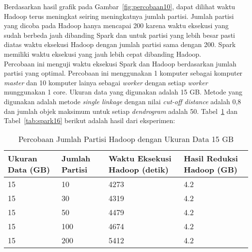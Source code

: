 Berdasarkan hasil grafik pada Gambar~\ref{fig:percobaan10}, dapat dilihat waktu Hadoop terus meningkat seiring meningkatnya jumlah partisi. Jumlah partisi yang dicoba pada Hadoop hanya mencapai 200 karena waktu eksekusi yang sudah berbeda jauh dibanding Spark dan untuk partisi yang lebih besar pasti diatas waktu eksekusi Hadoop dengan jumlah partisi sama dengan 200. Spark memiliki waktu eksekusi yang jauh lebih cepat dibanding Hadoop.\\





Percobaan ini menguji waktu eksekusi Spark dan Hadoop berdasarkan jumlah partisi yang optimal. Percobaan ini menggunakan 1 komputer sebagai komputer \textit{master} dan 10 komputer lainya sebagai \textit{worker} dengan setiap \textit{worker} munggunakan 1 core. Ukuran data yang digunakan adalah 15 GB. Metode yang digunakan adalah metode \textit{single linkage} dengan nilai \textit{cut-off distance} adalah 0,8 dan jumlah objek maksimum untuk setiap \textit{dendrogram} adalah 50. Tabel~\ref{tab:spark15} dan Tabel~\ref{tab:spark16} berikut adalah hasil dari eksperimen:





\begin{table}[H] 
	\centering 
	\caption{Percobaan Jumlah Partisi Hadoop dengan Ukuran Data 15 GB}
	\label{tab:spark15}
	\begin{tabular}{|p{3cm}|p{3cm}|p{4cm}|p{4cm}|}
\hline
Ukuran Data (GB) & Jumlah Partisi &  Waktu Eksekusi Hadoop (detik) & Hasil Reduksi Hadoop (GB)\\
\hline
15 & 10 & 4273  & 4.2  \\
\hline
15 & 30 & 4319  & 4.2  \\
\hline
15 & 50 & 4479  & 4.2  \\
\hline
15 & 100 & 4674  & 4.2  \\
\hline
15 & 200 & 5412 & 4.2  \\
\hline


\hline

	\end{tabular} 
\end{table}




